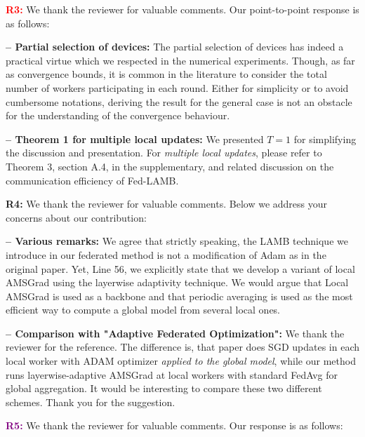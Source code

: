 \documentclass{article}
\begin{document}
 \vspace{1pt}
\textbf{\textcolor{red}{R3:}} We thank the reviewer for valuable comments.  Our point-to-point response is as follows: \vspace{-1pt}

\textbf{-- Partial selection of devices:} The partial selection of devices has indeed a practical virtue which we respected in the numerical experiments.
Though, as far as convergence bounds, it is common in the literature to consider the total number of workers participating in each round.
Either for simplicity or to avoid cumbersome notations, deriving the result for the general case is not an obstacle for the understanding of the convergence behaviour.

\vspace{-0.5pt}
\textbf{-- Theorem 1 for multiple local updates:} 
We presented $T =1$ for simplifying the discussion and presentation.
For \emph{multiple local updates}, please refer to Theorem 3, section A.4, in the supplementary, and related discussion on the communication efficiency of Fed-LAMB. 
 
 \vspace{1pt}
\textbf{\textcolor{green!50!black}{R4:}} We thank the reviewer for valuable comments. Below we address your concerns about our contribution: \vspace{-1pt}

\textbf{-- Various remarks:}
We agree that strictly speaking, the LAMB technique we introduce in our federated method is not a modification of Adam as in the original paper.
Yet, Line 56, we explicitly state that we develop a variant of local AMSGrad using the layerwise adaptivity technique.
We would argue that Local AMSGrad is used as a backbone and that periodic averaging is used as the most efficient way to compute a global model from several local ones.

\vspace{-0.5pt}
\textbf{-- Comparison with "Adaptive Federated Optimization":} 
We thank the reviewer for the reference.
The difference is, that paper does SGD updates in each local worker with ADAM optimizer \emph{applied to the global model}, while our method runs layerwise-adaptive AMSGrad at local workers with standard FedAvg for global aggregation.
It would be interesting to compare these two different schemes. 
Thank you for the suggestion.

 \vspace{1pt}
\textbf{\textcolor{purple}{R5:}} We thank the reviewer for valuable comments. Our response is as follows: \vspace{-1pt}
\end{document}

